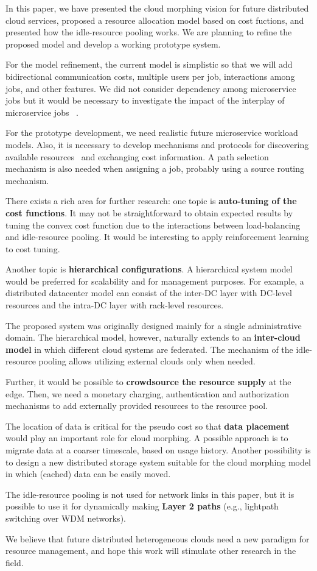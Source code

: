 
In this paper, we have presented the cloud morphing vision for
future distributed cloud services,
proposed a resource allocation model based on cost fuctions,
and presented how the idle-resource pooling works.
We are planning to refine the proposed model and develop a working
prototype system.

For the model refinement,
the current model is simplistic so that we will add bidirectional
communication costs,
multiple users per job, interactions among jobs, and other features.
We did not consider dependency among microservice jobs but it would be
necessary to investigate the impact of the interplay of microservice
jobs ~\cite{Suresh-SOA-SOCC2017}.

For the prototype development,
we need realistic future microservice workload models.
Also, it is necessary to develop mechanisms and protocols for
discovering available resources~\cite{Albrecht2008} and exchanging
cost information.
A path selection mechanism is also needed when assigning a job,
probably using a source routing mechanism.

There exists a rich area for further research:
one topic is {\bf auto-tuning of the cost functions}.
It may not be straightforward to obtain expected results by tuning the
convex cost function due to the interactions between load-balancing
and idle-resource pooling.
It would be interesting to apply reinforcement learning to cost
tuning.

Another topic is {\bf hierarchical configurations}.
A hierarchical system model would be preferred for scalability
and for management purposes.
For example, a distributed datacenter model can consist of
the inter-DC layer with DC-level resources and the intra-DC layer
with rack-level resources.

The proposed system was originally designed mainly for a single
administrative domain.
The hierarchical model, however, naturally extends to
an {\bf inter-cloud model} in which different cloud systems are
federated.
The mechanism of the idle-resource pooling allows utilizing external
clouds only when needed.

Further, it would be possible to {\bf crowdsource the resource supply}
at the edge. 
Then, we need a monetary charging, authentication and authorization
mechanisms to add externally provided resources to the resource pool.

The location of data is critical for the pseudo cost so that
{\bf data placement} would play an important role for cloud morphing. 
A possible approach is to migrate data at a coarser timescale, based
on usage history.
Another possibility is to design a new distributed storage system
suitable for the cloud morphing model in which (cached) data can be
easily moved.

The idle-resource pooling is not used for network links in this paper, but
it is possible to use it for dynamically making {\bf Layer 2 paths}
(e.g., lightpath switching over WDM networks).

We believe that future distributed heterogeneous clouds need a new
paradigm for resource management, and hope this work will stimulate
other research in the field.
